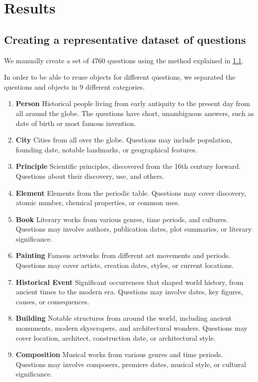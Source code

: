 \section{Results}

\subsection{Creating a representative dataset of questions}
\label{creating_dataset}

We manually create a set of 4760 questions using the method explained in \cref{creating_dataset}.

In order to be able to reuse objects for different questions, we separated the questions and objects in 9 different categories.

\begin{enumerate}
	\item \textbf{Person} Historical people living from early antiquity to the present day from all around the globe. The questions have short, unambiguous answers, such as date of birth or most famous invention.
	\item \textbf{City} Cities from all over the globe. Questions may include population, founding date, notable landmarks, or geographical features.
	\item \textbf{Principle} Scientific principles, discovered from the 16th century forward. Questions about their discovery, use, and others.
	\item \textbf{Element} Elements from the periodic table. Questions may cover discovery, atomic number, chemical properties, or common uses.
	\item \textbf{Book} Literary works from various genres, time periods, and cultures. Questions may involve authors, publication dates, plot summaries, or literary significance.
	\item \textbf{Painting} Famous artworks from different art movements and periods. Questions may cover artists, creation dates, styles, or current locations.
	\item \textbf{Historical Event} Significant occurrences that shaped world history, from ancient times to the modern era. Questions may involve dates, key figures, causes, or consequences.
	\item \textbf{Building} Notable structures from around the world, including ancient monuments, modern skyscrapers, and architectural wonders. Questions may cover location, architect, construction date, or architectural style.
	\item \textbf{Composition} Musical works from various genres and time periods. Questions may involve composers, premiere dates, musical style, or cultural significance.
\end{enumerate}

